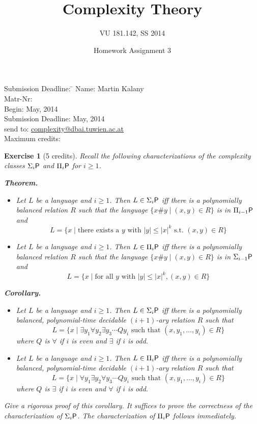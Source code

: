 \documentclass [11pt]{article}
\title{Complexity Theory}
\author{VU 181.142, SS 2014}
\date{Homework Assignment 3}
\newtheorem{exercise}{Exercise}
\newcommand{\ccfont}[1]{\protect\mathsf{#1}}
\newcommand{\Ptime}{\ccfont{P}}
\newcommand{\phs}[1]{\Sigma_{#1}\Ptime}
\newcommand{\php}[1]{\Pi_{#1}\Ptime}
\begin{document}
\maketitle

\begin{tabbing}
Submission Deadline: \quad \= \kill
Name: \> Martin Kalany \\
Matr-Nr:  \\
Begin:  May, 2014  \\
Submission Deadline:  May, 2014  \\
send to: \> \url{complexity@dbai.tuwien.ac.at}\\
Maximum credits:  
\end{tabbing}


\medskip

\noindent
\begin{exercise}[5 credits]
{\em 
Recall the following characterizations of the complexity classes 
$\phs{i}$ and $\php{i}$ for $i \geq 1$. 
}%


\medskip

\noindent
{\bf Theorem.}
\begin{itemize}
\item Let $L$ be a language and $i \geq 1$. Then $L \in \phs{i}$ iff there is
a polynomially balanced relation $R$ such that the language 
$\{x\# y \mid (x,y) \in R\}$ is in $\php{i-1}$ and 
\[
L = \{x \mid \mbox{there exists a } y 
\mbox{ with } |y| \leq |x|^k
\mbox{ s.t. } (x,y) \in R\}
\]


\item Let $L$ be a language and $i \geq 1$. Then $L \in \php{i}$ iff there is
a polynomially balanced relation $R$ such that the language 
$\{x\# y \mid (x,y) \in R\}$ is in $\phs{i-1}$ and 
\[
L = \{x \mid \mbox{for all } y \mbox{ with } |y| \leq |x|^k, (x,y) \in R\}
\]
\end{itemize}


\medskip

\noindent
{\bf Corollary.}
%
\begin{itemize}
\item Let $L$ be a language and $i \geq 1$. Then $L \in \phs{i}$ iff there is
a polynomially balanced, polynomial-time decidable $(i+1)$-ary
relation $R$ such that 
\[
L = \{x \mid \exists y_1 \forall y_2\exists y_3\cdots Q y_i \mbox{ such
that } 
(x,y_1,\ldots,y_i) \in R\}
\]
where $Q$ is $\forall$ if $i$ is even and $\exists$ if $i$ is odd. 

\item 
Let $L$ be a language and $i \geq 1$. Then $L \in \php{i}$ iff there is
a polynomially balanced, polynomial-time decidable $(i+1)$-ary
relation $R$ such that 
\[
L = \{x \mid \forall y_1 \exists y_2\forall y_3\cdots Q y_i \mbox{ such
that } 
(x,y_1,\ldots,y_i) \in R\}
\]
where $Q$ is $\exists$ if $i$ is even and $\forall$ if $i$ is odd. 
\end{itemize}




\medskip
\noindent
{\em 
Give a rigorous proof of this corollary.
It suffices to prove the correctness of the characterization of 
$\phs{i}$. The characterization of $\php{i}$ follows immediately.
}%
\end{exercise}
\end{document}
